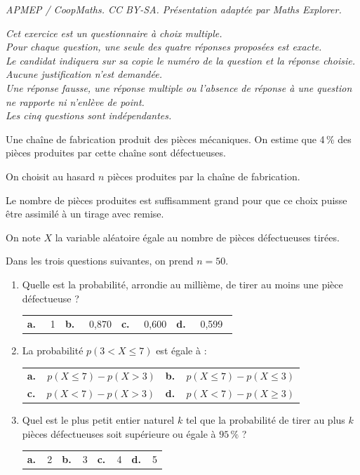 \documentclass[10pt]{article}
\begin{document}
\noindent\textit{APMEP / CoopMaths. CC BY-SA. Présentation adaptée par Maths Explorer.}\par\medskip
\medskip

\emph{Cet exercice est un questionnaire à choix multiple.\\
Pour chaque question, une seule des quatre réponses proposées est exacte.\\
Le candidat indiquera sur sa copie le numéro de la question et la réponse choisie.\\
Aucune justification n'est demandée.\\
Une réponse fausse, une réponse multiple ou l'absence de réponse à une question ne rapporte ni n'enlève de point.\\
Les cinq questions sont indépendantes.}

\medskip

Une chaîne de fabrication produit des pièces mécaniques. On estime que 4\,\% des pièces produites par cette chaîne sont défectueuses.

On choisit au hasard $n$ pièces produites par la chaîne de fabrication. 

Le nombre de pièces produites est suffisamment grand pour que ce choix puisse être assimilé à un tirage avec remise. 

On note $X$ la variable aléatoire égale au nombre de pièces défectueuses tirées.

Dans les trois questions suivantes, on prend $n = 50$.

\medskip

\begin{enumerate}
\item Quelle est la probabilité, arrondie au millième, de tirer au moins une pièce défectueuse ?

\begin{center}
\begin{tabularx}{\linewidth}{*{4}X}
\textbf{a.~~} 1&\textbf{b.~~} 0,870&\textbf{c.~~} 0,600&\textbf{d.~~} 0,599\
\end{tabularx}
\end{center}

\item La probabilité $p(3 < X \leqslant 7)$ est égale à :
\begin{center}
\begin{tabularx}{\linewidth}{*{2}X}
\textbf{a.~~}$p(X \leqslant 7) - p(X > 3)$&
\textbf{b.~~}$p(X \leqslant 7) - p(X \leqslant 3)$\\
\textbf{c.~~}$p(X < 7)- p(X > 3)$&
\textbf{d.~~}$p(X < 7) - p(X \geqslant 3)$
\end{tabularx}
\end{center}
\item Quel est le plus petit entier naturel $k$ tel que la probabilité de tirer au plus $k$ pièces défectueuses soit supérieure ou égale à $95\,\%$ ?

\begin{center}
\begin{tabularx}{\linewidth}{*{4}X}
\textbf{a.~~}2&\textbf{b.~~}3&\textbf{c.~~}4&\textbf{d.~~}5
\end{tabularx}
\end{center}
\end{enumerate}
\end{document}

